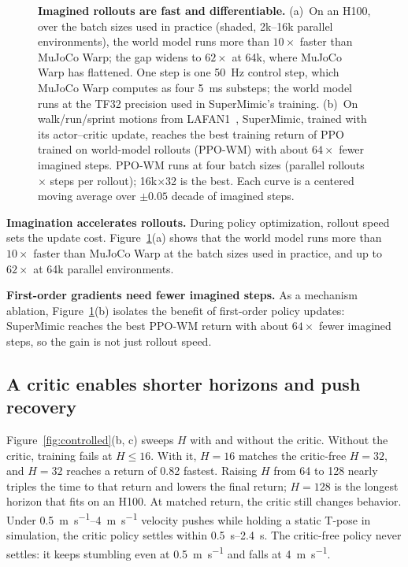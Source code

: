\begin{figure}[t]
\caption{\textbf{Imagined rollouts are fast and differentiable.} (a)~On an H100, over the batch sizes used in practice (shaded, 2k--16k parallel environments), the world model runs more than $10\times$ faster than MuJoCo Warp; the gap widens to $62\times$ at 64k, where MuJoCo Warp has flattened. One step is one \qty{50}{\hertz} control step, which MuJoCo Warp computes as four \qty{5}{\milli\second} substeps; the world model runs at the TF32 precision used in SuperMimic's training. (b)~On walk/run/sprint motions from LAFAN1~\citep{harvey2020robust}, SuperMimic, trained with its actor--critic update, reaches the best training return of PPO trained on world-model rollouts (PPO-WM) with about $64\times$ fewer imagined steps. PPO-WM runs at four batch sizes (parallel rollouts $\times$ steps per rollout); 16k$\times$32 is the best. Each curve is a centered moving average over $\pm0.05$ decade of imagined steps.}
\label{fig:wm-efficiency}
\end{figure}

\noindent\textbf{Imagination accelerates rollouts.} During policy optimization, rollout speed sets the update cost. Figure~\ref{fig:wm-efficiency}(a) shows that the world model runs more than $10\times$ faster than MuJoCo Warp at the batch sizes used in practice, and up to $62\times$ at 64k parallel environments.

\noindent\textbf{First-order gradients need fewer imagined steps.} As a mechanism ablation, Figure~\ref{fig:wm-efficiency}(b) isolates the benefit of first-order policy updates: SuperMimic reaches the best PPO-WM return with about $64\times$ fewer imagined steps, so the gain is not just rollout speed.

\subsection{A critic enables shorter horizons and push recovery}
\label{sec:critic}

Figure~\ref{fig:controlled}(b, c) sweeps $H$ with and without the critic. Without the critic, training fails at $H\le16$. With it, $H{=}16$ matches the critic-free $H{=}32$, and $H{=}32$ reaches a return of 0.82 fastest. Raising $H$ from 64 to 128 nearly triples the time to that return and lowers the final return; $H{=}128$ is the longest horizon that fits on an H100. At matched return, the critic still changes behavior. Under \qtyrange{0.5}{4}{\metre\per\second} velocity pushes while holding a static T-pose in simulation, the critic policy settles within \qtyrange{0.5}{2.4}{\second}. The critic-free policy never settles: it keeps stumbling even at \qty{0.5}{\metre\per\second} and falls at \qty{4}{\metre\per\second}.
